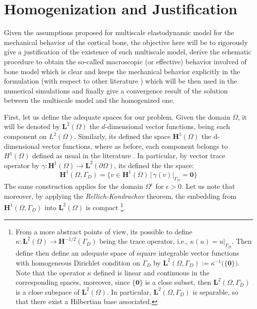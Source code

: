 \chapter{Homogenization and Justification}

Given the assumptions proposed for multiscale elastodynamic model for the mechanical behavior of the cortical bone, the objective here will be to rigorously give a justification of the existence of such multiscale model, derive the schematic procedure to obtain the so-called macroscopic (or effective) behavior involved of bone model which is clear and keeps the mechanical behavior explicitly in the formulation (with respect to other literature \cite{Parnell2008}) which will be then used in the numerical simulations and finally give a convergence result of the solution between the multiscale model and the homogenized one.

First, let us define the adequate spaces for our problem. Given the domain $\Omega$, it will be denoted by $\mathbf{L}^2(\Omega)$ the $d$-dimensional vector functions, being each component on $L^2(\Omega)$. Similarly, its defined the space $\mathbf{H}^1(\Omega)$ the d-dimensional vector functions, where as before, each component belongs to $H^1(\Omega)$ defined as usual in the literature \cite{evans2010partial}. 
In particular, by vector trace operator by $\gamma: \mathbf{H}^1(\Omega) \rightarrow \mathbf{L}^2(\partial \Omega)$, its defined the the space:
\begin{equation*}
    \mathbf{H}^1(\Omega, \Gamma_D) = \big \{ v \in \mathbf{H}^1(\Omega) \, \vert \, \gamma (v) \vert_{\Gamma_D} = \mathbf{0} \big \}
\end{equation*}
The same construction applies for the domain $\Omega^{\epsilon}$ for $\epsilon > 0$.
Let us note that moreover, by applying the \textit{Rellich-Kondrachov} theorem, the embedding from $\mathbf{H}^1(\Omega, \Gamma_D)$ into $\mathbf{L}^2(\Omega)$ is compact \footnote{From a more abstract points of view, its possible to define $\kappa: \mathbf{L}^2( \Omega) \longrightarrow \mathbf{H}^{-1/2}(\Gamma_D)$ being the trace operator, i.e., $\kappa (u) = u \vert_{\Gamma_D}$. Then define then define an adequate space of square integrable vector functions with homogeneous Dirichlet condition on $\Gamma_D$ by $\mathbf{L}^2(\Omega, \Gamma_D) := \kappa^{-1}\big( \{ \mathbf{0}\}\big)$. Note that the operator $\kappa$ defined is linear and continuous in the corresponding spaces, moreover, since $\{\mathbf{0}\}$ is a close subset, then $\mathbf{L}^2(\Omega, \Gamma_D)$ is a close subspace of $\mathbf{L}^2(\Omega)$.
In particular, $\mathbf{L}^2(\Omega, \Gamma_D)$ is separable, so that there exist a Hilbertian base associated.}.

